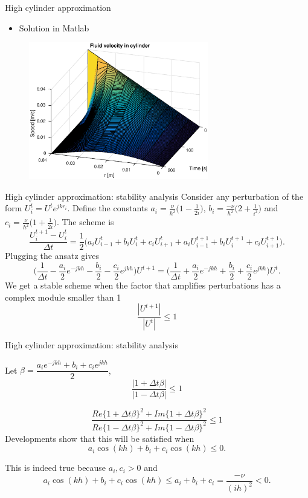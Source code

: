 \documentclass{beamer}
\begin{document}
\begin{frame}{High cylinder approximation}
\begin{itemize}
\item Solution in Matlab
\end{itemize}
\begin{figure}[!h]
\centering
\includegraphics[width = 0.7\textwidth]{./dim1.eps}
\end{figure}
\end{frame}

\begin{frame}{High cylinder approximation: stability analysis}
Consider any perturbation of the form $U_{i}^{t}= U^{t}e^{jkr_i}.$
Define the constants $a_i=\frac{\nu}{h^2}\Big(1-\frac{1}{2i}\Big)$, $b_i=\frac{-\nu}{h^2}\Big(2+\frac{1}{i^2}\Big)$ and $c_i=\frac{\nu}{h^2}\Big(1+\frac{1}{2i}\Big)$. The scheme is 
$$\frac{U_{i}^{t+1}-U_{i}^{t}}{\Delta t}=\frac{1}{2}\Big( a_{i}U_{i-1}^{t}
+b_{i}U_{i}^{t}+c_{i}U_{i+1}^{t}
+ a_{i}U_{i-1}^{t+1}
+b_{i}U_{i}^{t+1}+c_{i}U_{i+1}^{t+1}\Big).$$
Plugging the ansatz gives
$$\Big(\frac{1}{\Delta t} -\frac{a_i}{2}e^{-jkh} -\frac{b_i}{2} -\frac{c_i}{2}e^{jkh}\Big)U^{t+1}=\Big(\frac{1}{\Delta t} +\frac{a_i}{2}e^{-jkh} +\frac{b_i}{2} +\frac{c_i}{2}e^{jkh}\Big)U^{t} .$$
 We get a stable scheme when the factor that amplifies perturbations has a complex module smaller than 1
 $$\dfrac{|U^{t+1}|}{|U^t|}\leq 1$$
\end{frame}
\begin{frame}{High cylinder approximation: stability analysis}

Let $\beta = \dfrac{a_ie^{-jkh} +b_i +c_ie^{jkh}}{2}$,
$$\dfrac{|1+\Delta t \beta|}{|1-\Delta t \beta|}\leq 1$$

$$\dfrac{Re\{1+\Delta t \beta\}^2 + Im\{1+\Delta t \beta\}^2 }{Re\{1-\Delta t \beta\}^2 + Im\{1-\Delta t \beta\}^2}\leq 1$$
Developments show that this will be satisfied when
$$a_i\cos(kh)+b_i + c_i \cos(kh)\leq 0.$$

This is indeed true because $a_i, c_i >0$ and
$$a_i\cos(kh)+b_i + c_i \cos(kh)\leq a_i + b_i + c_i = \frac{-\nu}{(ih)^2}< 0.$$

\end{frame}
\end{document}
